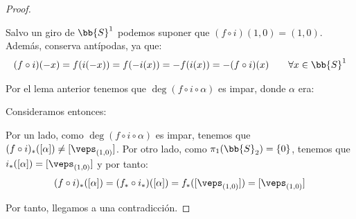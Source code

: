 \begin{lema}
\begin{proof}
\begin{figure}[ht]
        \end{figure}

        Salvo un giro de $\bb{S}^1$ podemos suponer que $(f\circ i)(1,0)=(1,0)$. Además, conserva antípodas, ya que:
        \begin{gather*}
            (f\circ i)(-x) = f(i(-x)) = f(-i(x)) = -f(i(x)) = -(f\circ i)(x)\qquad \forall x\in \bb{S}^1
        \end{gather*}
        
        Por el lema anterior tenemos que $\deg(f\circ i \circ \alpha)$ es impar, donde $\alpha$ era:

        Consideramos entonces:
        \begin{center}
        \end{center}

        Por un lado, como $\deg(f\circ i \circ \alpha)$ es impar, tenemos que $(f\circ i)_*([\alpha])\neq [\veps_{(1,0)}]$. Por otro lado, como $\pi_1(\bb{S}_2)=\{0\}$, tenemos que $i_*([\alpha])=[\veps_{(1,0)}]$ y por tanto:
        \begin{gather*}
            (f\circ i)_*([\alpha]) = (f_* \circ i_*)([\alpha]) = f_*([\veps_{(1,0)}]) = [\veps_{(1,0)}]
        \end{gather*}

        Por tanto, llegamos a una contradicción.
    \end{proof}
\end{lema}

